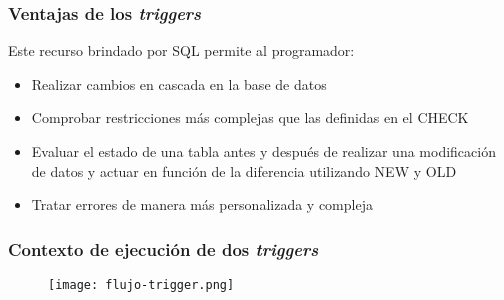 
\begin{frame}[fragile]
	
	\frametitle{Ventajas de los \emph{triggers}}
	
	Este recurso brindado por SQL permite al programador:
	
	\begin{itemize}
		
		\item Realizar cambios en cascada en la base de datos
		
		\pause 
		
		\item Comprobar restricciones más complejas que las definidas en el \textcolor{codepurple}{CHECK}
		
		\pause
		
		\item Evaluar el estado de una tabla antes y después de realizar una modificación de datos y actuar en función de la diferencia utilizando \textcolor{codepurple}{NEW} y \textcolor{codepurple}{OLD}
		
		\pause
		
		\item Tratar errores de manera más personalizada y compleja
		
	\end{itemize}

\end{frame}


\begin{frame}[fragile]
	
	\frametitle{Contexto de ejecución de dos \emph{triggers}}
	
	\begin{figure}[h]
		\centering
		\texttt{[image: flujo-trigger.png]}
	\end{figure}

\end{frame}


